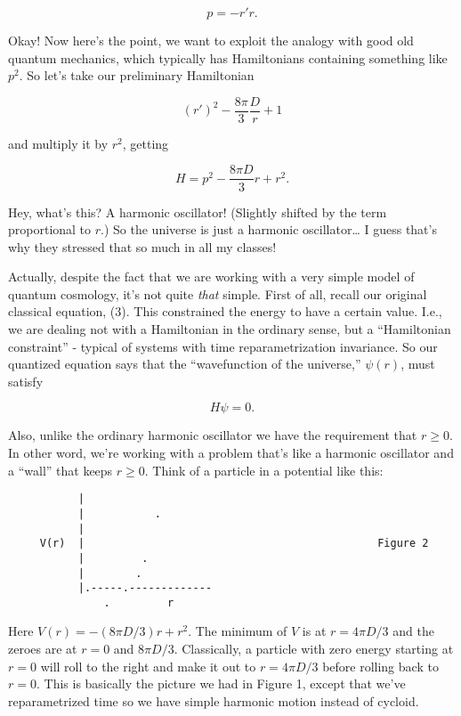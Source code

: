 \documentclass{article}
\begin{document}
\[p = -r'r.\]

Okay! Now here's the point, we want to exploit the analogy with good old
quantum mechanics, which typically has Hamiltonians containing something
like \(p^2\). So let's take our preliminary Hamiltonian

\[(r')^2 - \frac{8\pi}{3} \frac{D}{r} + 1\]

and multiply it by \(r^2\), getting

\[H = p^2 - \frac{8\pi D}{3}r + r^2.\]

Hey, what's this? A harmonic oscillator! (Slightly shifted by the term
proportional to \(r\).) So the universe is just a harmonic
oscillator\ldots{} I guess that's why they stressed that so much in all
my classes!

Actually, despite the fact that we are working with a very simple model
of quantum cosmology, it's not quite \emph{that} simple. First of all,
recall our original classical equation, (3). This constrained the energy
to have a certain value. I.e., we are dealing not with a Hamiltonian in
the ordinary sense, but a ``Hamiltonian constraint'' - typical of
systems with time reparametrization invariance. So our quantized
equation says that the ``wavefunction of the universe,'' \(\psi(r)\),
must satisfy

\[H \psi = 0.\]

Also, unlike the ordinary harmonic oscillator we have the requirement
that \(r\geqslant0\). In other word, we're working with a problem that's
like a harmonic oscillator and a ``wall'' that keeps \(r\geqslant0\).
Think of a particle in a potential like this:

\begin{verbatim}
           |
           |           .   
           |                           
     V(r)  |                                              Figure 2 
           |         .                                
           |        .                                 
           |.-----.-------------
               .         r 
\end{verbatim}

Here \(V(r) = - (8\pi D/3)r + r^2\). The minimum of \(V\) is at
\(r = 4 \pi D/3\) and the zeroes are at \(r = 0\) and \(8 \pi D/3\).
Classically, a particle with zero energy starting at \(r = 0\) will roll
to the right and make it out to \(r = 4\pi D/3\) before rolling back to
\(r = 0\). This is basically the picture we had in Figure 1, except that
we've reparametrized time so we have simple harmonic motion instead of
cycloid.
\end{document}
